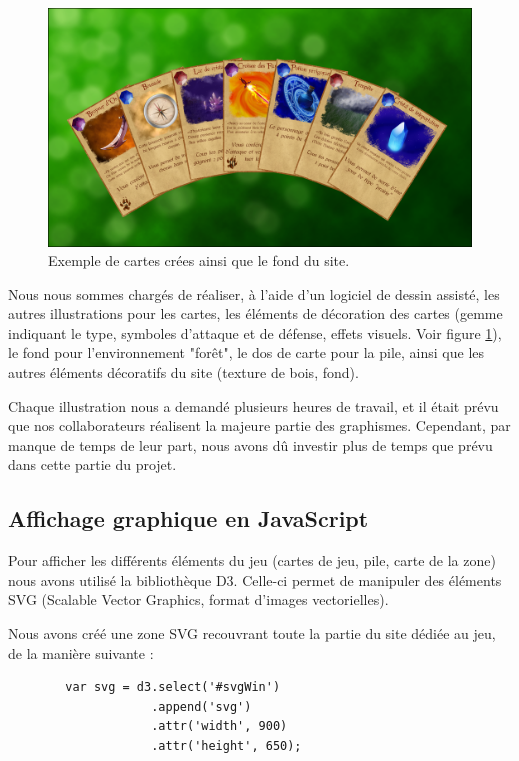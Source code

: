 \documentclass[12pt]{report}
\begin{document}
        \begin{figure}[h!]
	       	\centering
           	\includegraphics[scale=0.4]{cards.png}
           	\caption{Exemple de cartes crées ainsi que le fond du site.}
           	\label{fig:cartes}
        \end{figure}

        Nous nous sommes chargés de réaliser, à l'aide d'un logiciel de dessin assisté, les autres illustrations pour les cartes, les éléments de décoration des cartes (gemme indiquant le type, symboles d'attaque et de défense, effets visuels. Voir figure \ref{fig:cartes}), le fond pour l'environnement "forêt", le dos de carte pour la pile, ainsi que les autres éléments décoratifs du site (texture de bois, fond).

        Chaque illustration nous a demandé plusieurs heures de travail, et il était prévu que nos collaborateurs réalisent la majeure partie des graphismes. Cependant, par manque de temps de leur part, nous avons dû investir plus de temps que prévu dans cette partie du projet.


        \subsection{Affichage graphique en JavaScript}

        Pour afficher les différents éléments du jeu (cartes de jeu, pile, carte de la zone) nous avons utilisé la bibliothèque D3. Celle-ci permet de manipuler des éléments SVG (Scalable Vector Graphics, format d'images vectorielles).

        Nous avons créé une zone SVG recouvrant toute la partie du site dédiée au jeu, de la manière suivante :

        \begin{verbatim}
        var svg = d3.select('#svgWin')
                    .append('svg')
                    .attr('width', 900)
                    .attr('height', 650);
        \end{verbatim}
\end{document}
